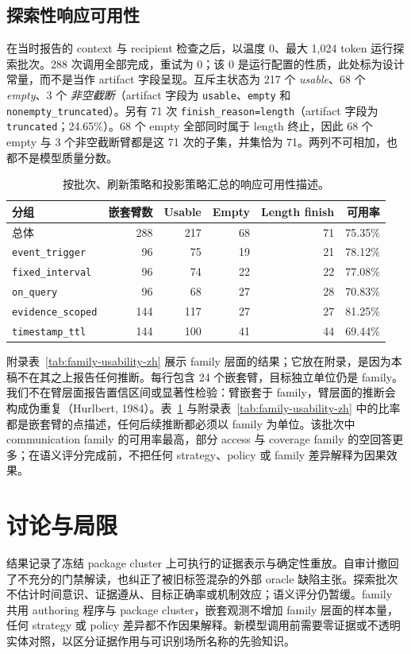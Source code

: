 \documentclass[UTF8,11pt]{ctexart}
\begin{document}
\subsection{探索性响应可用性}
在当时报告的 context 与 recipient 检查之后，以温度 0、最大 1,024 token 运行探索批次。288 次调用全部完成，重试为 0；该 0 是运行配置的性质，此处标为设计常量，而不是当作 artifact 字段呈现。互斥主状态为 217 个 \emph{usable}、68 个 \emph{empty}、3 个 \emph{非空截断}（artifact 字段为 \texttt{usable}、\texttt{empty} 和 \texttt{nonempty\_truncated}）。另有 71 次 \texttt{finish\_reason=length}（artifact 字段为 \texttt{truncated}；24.65\%）。68 个 empty 全部同时属于 length 终止，因此 68 个 empty 与 3 个非空截断臂都是这 71 次的子集，并集恰为 71。两列不可相加，也都不是模型质量分数。

\begin{table}[h]
\centering
\caption{按批次、刷新策略和投影策略汇总的响应可用性描述。}
\label{tab:usability-zh}
\small
\begin{tabular}{lrrrrr}
\toprule
分组 & 嵌套臂数 & Usable & Empty & Length finish & 可用率 \\
\midrule
总体 & 288 & 217 & 68 & 71 & 75.35\% \\
\texttt{event\_trigger} & 96 & 75 & 19 & 21 & 78.12\% \\
\texttt{fixed\_interval} & 96 & 74 & 22 & 22 & 77.08\% \\
\texttt{on\_query} & 96 & 68 & 27 & 28 & 70.83\% \\
\texttt{evidence\_scoped} & 144 & 117 & 27 & 27 & 81.25\% \\
\texttt{timestamp\_ttl} & 144 & 100 & 41 & 44 & 69.44\% \\
\bottomrule
\end{tabular}
\end{table}

附录表~\ref{tab:family-usability-zh} 展示 family 层面的结果；它放在附录，是因为本稿不在其之上报告任何推断。每行包含 24 个嵌套臂，目标独立单位仍是 family。我们不在臂层面报告置信区间或显著性检验：臂嵌套于 family，臂层面的推断会构成伪重复（Hurlbert, 1984）。表~\ref{tab:usability-zh} 与附录表~\ref{tab:family-usability-zh} 中的比率都是嵌套臂的点描述，任何后续推断都必须以 family 为单位。该批次中 communication family 的可用率最高，部分 access 与 coverage family 的空回答更多；在语义评分完成前，不把任何 strategy、policy 或 family 差异解释为因果效果。



\section{讨论与局限}
结果记录了冻结 package cluster 上可执行的证据表示与确定性重放。自审计撤回了不充分的门禁解读，也纠正了被旧标签混杂的外部 oracle 缺陷主张。探索批次不估计时间意识、证据遵从、目标正确率或机制效应；语义评分仍暂缓。family 共用 authoring 程序与 package cluster，嵌套观测不增加 family 层面的样本量，任何 strategy 或 policy 差异都不作因果解释。新模型调用前需要零证据或不透明实体对照，以区分证据作用与可识别场所名称的先验知识。
\end{document}
